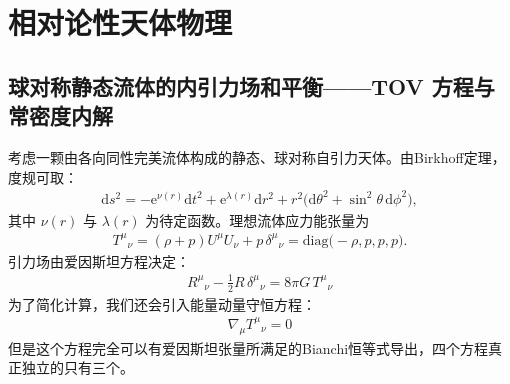 \section{相对论性天体物理}
\subsection{球对称静态流体的内引力场和平衡——TOV 方程与常密度内解}

考虑一颗由各向同性完美流体构成的静态、球对称自引力天体。由Birkhoff定理，度规可取：
\begin{align}
\mathrm{d}s^{2}=-\mathrm{e}^{\nu(r)}\mathrm{d}t^{2}+\mathrm{e}^{\lambda(r)}\mathrm{d}r^{2}+r^{2}\bigl(\mathrm{d}\theta^{2}+\sin^{2}\theta\,\mathrm{d}\phi^{2}\bigr),\label{eq:metric}
\end{align}
其中 $\nu(r)$ 与 $\lambda(r)$ 为待定函数。理想流体应力能张量为
\begin{align}
T^{\mu}{}_{\nu}=(\rho+p)U^{\mu}U_{\nu}+p\,\delta^{\mu}{}_{\nu}
=\mathrm{diag}\bigl(-\rho,p,p,p\bigr).\label{eq:stress}
\end{align}
引力场由爱因斯坦方程决定：
\begin{align}
R^{\mu}{}_{\nu}-\tfrac{1}{2}R\,\delta^{\mu}{}_{\nu}=8\pi G\,T^{\mu}{}_{\nu}\label{eq:einstein}
\end{align}
为了简化计算，我们还会引入能量动量守恒方程：
\begin{align}
\nabla_{\mu}T^{\mu}{}_{\nu}=0\label{eq:cons}
\end{align}
但是这个方程完全可以有爱因斯坦张量所满足的Bianchi恒等式导出，四个方程真正独立的只有三个。


